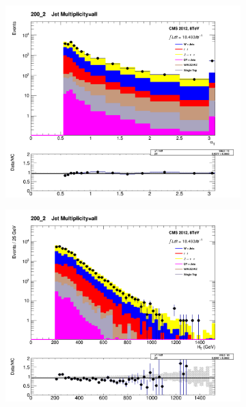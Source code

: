 \begin{figure}[!ht]
  \centering
    \begin{subfigure}[b]{0.48\textwidth}
      \includegraphics[width=\textwidth]{Figs/datamc/had/Stacked_AlphaT_all_200_upwards}
      \caption{\alphat}
    \end{subfigure}
    \begin{subfigure}[b]{0.48\textwidth}
      \includegraphics[width=\textwidth]{Figs/datamc/had/Stacked_HT_all_200_upwards}
      \caption{\HT}
    \end{subfigure} \\

\end{figure}

